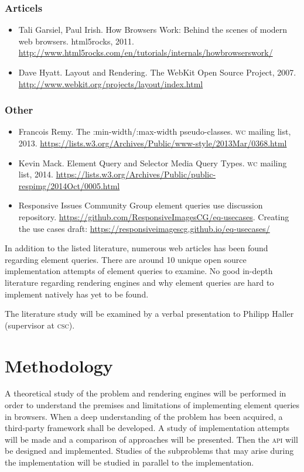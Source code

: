 \documentclass[oneside,a4paper,11pt]{kth-mag}
\begin{document}
\subsubsection*{Articels}
\begin{itemize}
\item Tali Garsiel, Paul Irish. How Browsers Work: Behind the scenes of modern web browsers. html5rocks, 2011. \url{http://www.html5rocks.com/en/tutorials/internals/howbrowserswork/}
\item Dave Hyatt. Layout and Rendering. The WebKit Open Source Project, 2007. \url{http://www.webkit.org/projects/layout/index.html}
\end{itemize}

\subsubsection{Other}
\begin{itemize}
\item Francois Remy. The :min-width/:max-width pseudo-classes. \textsc{w}\textsc{c} mailing list, 2013. \url{https://lists.w3.org/Archives/Public/www-style/2013Mar/0368.html}
\item Kevin Mack. Element Query and Selector Media Query Types. \textsc{w}\textsc{c} mailing list, 2014. \url{https://lists.w3.org/Archives/Public/public-respimg/2014Oct/0005.html}
\item Responsive Issues Community Group element queries use discussion repository. \url{https://github.com/ResponsiveImagesCG/eq-usecases}. Creating the use cases draft: \url{https://responsiveimagescg.github.io/eq-usecases/}
\end{itemize}

In addition to the listed literature, numerous web articles has been found regarding element queries. There are around 10 unique open source implementation attempts of element queries to examine. No good in-depth literature regarding rendering engines and why element queries are hard to implement natively has yet to be found.

The literature study will be examined by a verbal presentation to Philipp Haller (supervisor at \textsc{csc}).

\section*{Methodology}
A theoretical study of the problem and rendering engines will be performed in order to understand the premises and limitations of implementing element queries in browsers. When a deep understanding of the problem has been acquired, a third-party framework shall be developed. A study of implementation attempts will be made and a comparison of approaches will be presented. Then the \textsc{api} will be designed and implemented. Studies of the subproblems that may arise during the implementation will be studied in parallel to the implementation.
\end{document}
